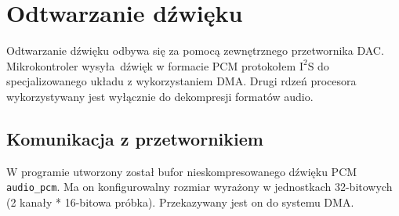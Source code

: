 \documentclass[polish]{aghengthesis}
\newcommand{\imgint}[4]{
	\begin{figure}[{#4}]
		\centering
		\texttt{[image: \#1]}
		\caption{#2}
		\label{#1}
	\end{figure}
}
\newcommand{\imgcs}[3]{\imgint{#1}{#2}{#3}{}}
\newcommand{\isqs}{$\text{I}^{2}\text{S}$}
\begin{document}
	\section{Odtwarzanie dźwięku}
%		
%		
%		
		
		
			
		Odtwarzanie dźwięku odbywa się za pomocą zewnętrznego przetwornika DAC. Mikrokontroler wysyła dźwięk w formacie PCM protokołem \isqs{} do specjalizowanego układu z wykorzystaniem DMA. Drugi rdzeń procesora wykorzystywany jest wyłącznie do dekompresji formatów audio.
		
		
		\subsection{Komunikacja z przetwornikiem}
			W programie utworzony został bufor nieskompresowanego dźwięku PCM \lstinline|audio_pcm|. Ma on konfigurowalny rozmiar wyrażony w jednostkach 32-bitowych (2 kanały * 16-bitowa próbka). Przekazywany jest on do systemu DMA.
		
\end{document}
